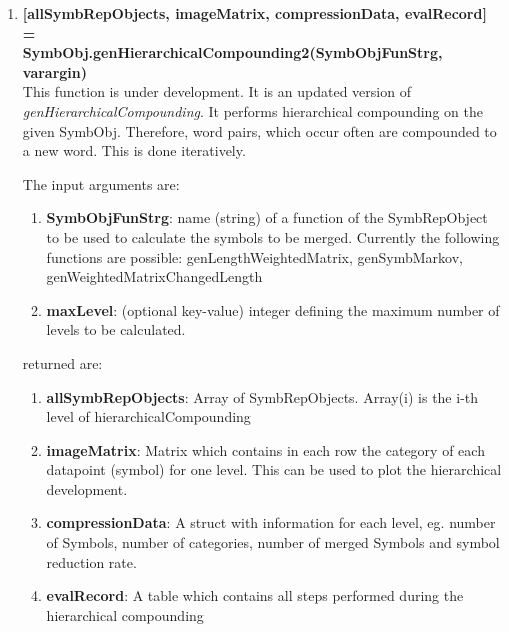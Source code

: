 \documentclass[a4]{scrreprt}
\begin{document}
\begin{enumerate}
	\item \textbf{[allSymbRepObjects, imageMatrix, compressionData, evalRecord] = \\SymbObj.genHierarchicalCompounding2(SymbObjFunStrg, varargin)}\\
		This function is under development. It is an updated version of \textit{genHierarchicalCompounding}. It performs hierarchical compounding on the given SymbObj. Therefore, word pairs, which occur often are compounded to a new word. This is done iteratively.
	
		The input arguments are:
		\begin{enumerate}
			\item \textbf{SymbObjFunStrg}: name (string) of a function of the SymbRepObject to be used to calculate the symbols to be merged. Currently the following functions are possible:  genLengthWeightedMatrix, genSymbMarkov, genWeightedMatrixChangedLength
			\item \textbf{maxLevel}: (optional key-value) integer defining the maximum number of levels to be calculated.
		\end{enumerate}
		returned are:
		\begin{enumerate}
			\item \textbf{allSymbRepObjects}: Array of SymbRepObjects. Array(i) is the i-th level of hierarchicalCompounding
			\item \textbf{imageMatrix}: Matrix which contains in each row the category of each datapoint (symbol) for one level. This can be used to plot the hierarchical development.
			\item \textbf{compressionData}: A struct with information for each level, eg. number of Symbols, number of categories, number of merged Symbols and symbol reduction rate.
			\item \textbf{evalRecord}: A table which contains all steps performed during the hierarchical compounding
		\end{enumerate}
	

\end{enumerate}
\end{document}
